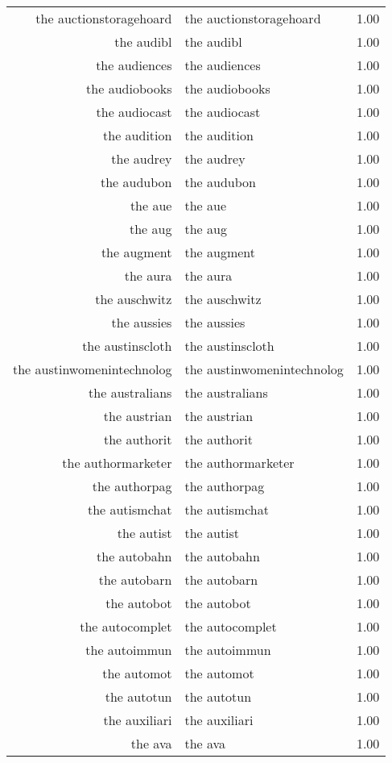 \begin{table}[ht]
\begin{tabular}{rlr}
  the auctionstoragehoard & the auctionstoragehoard & 1.00 \\ 
  the audibl & the audibl & 1.00 \\ 
  the audiences & the audiences & 1.00 \\ 
  the audiobooks & the audiobooks & 1.00 \\ 
  the audiocast & the audiocast & 1.00 \\ 
  the audition & the audition & 1.00 \\ 
  the audrey & the audrey & 1.00 \\ 
  the audubon & the audubon & 1.00 \\ 
  the aue & the aue & 1.00 \\ 
  the aug & the aug & 1.00 \\ 
  the augment & the augment & 1.00 \\ 
  the aura & the aura & 1.00 \\ 
  the auschwitz & the auschwitz & 1.00 \\ 
  the aussies & the aussies & 1.00 \\ 
  the austinscloth & the austinscloth & 1.00 \\ 
  the austinwomenintechnolog & the austinwomenintechnolog & 1.00 \\ 
  the australians & the australians & 1.00 \\ 
  the austrian & the austrian & 1.00 \\ 
  the authorit & the authorit & 1.00 \\ 
  the authormarketer & the authormarketer & 1.00 \\ 
  the authorpag & the authorpag & 1.00 \\ 
  the autismchat & the autismchat & 1.00 \\ 
  the autist & the autist & 1.00 \\ 
  the autobahn & the autobahn & 1.00 \\ 
  the autobarn & the autobarn & 1.00 \\ 
  the autobot & the autobot & 1.00 \\ 
  the autocomplet & the autocomplet & 1.00 \\ 
  the autoimmun & the autoimmun & 1.00 \\ 
  the automot & the automot & 1.00 \\ 
  the autotun & the autotun & 1.00 \\ 
  the auxiliari & the auxiliari & 1.00 \\ 
  the ava & the ava & 1.00 \\ 

\end{tabular}
\end{table}
